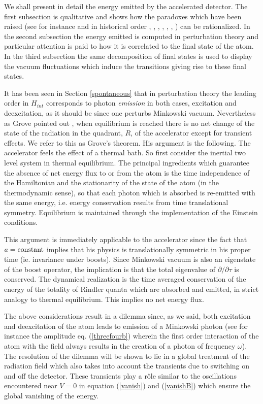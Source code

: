 \documentclass[12pt,oneside]{report}
\begin{document}
We shall present in detail the energy emitted by the
accelerated detector. The first subsection is qualitative and shows how the
paradoxes which have been raised (see for instance and in
historical order
\cite{UnWa}, \cite{Grow},
\cite{RSG}, \cite{Unru2}, \cite{MPB}, \cite{AuMu}, \cite{MaPa}) can be
rationalized. In the second subsection the energy emitted is computed in
perturbation theory and particular attention is paid to how it
is correlated to the final state of the atom. In the third
subsection the same decomposition of final states is used to
display the vacuum fluctuations which induce the transitions
giving rise to these final states.

It has been seen in Section \ref{spontaneous} that in perturbation theory the leading
order in $H_{int}$ corresponds to photon {\it emission} in both cases,
excitation and deexcitation, as it should be since one perturbs Minkowski
vacuum. Nevertheless as Grove pointed out \cite{Grow}, when equilibrium is
reached there is no net change of the state of the radiation in the quadrant,
$R$, of the accelerator except for transient effects. We refer to this as
Grove's theorem. His argument is the following. The accelerator feels the effect
of a thermal bath. 
So first consider the inertial two level system in thermal equilibrium. The
principal ingredients which guarantee the absence of net energy flux to or
from the atom is the time independence of the Hamiltonian and the
stationarity of the 
state of the atom (in the thermodynamic sense), so that each
photon which is absorbed  is re-emitted  with the
same energy, i.e. energy conservation results from time translational
symmetry. Equilibrium is maintained through the implementation of the
Einstein conditions.

This argument is immediately applicable to the accelerator since the
fact that $a={\rm constant}$ implies that his physics is translationally
symmetric in his proper time (ie. invariance under boosts). Since Minkowski vacuum is
also an eigenstate of the boost operator, the implication is that the total eigenvalue
of $\partial /\partial \tau$ is conserved. The dynamical realization is the time
averaged conservation of the energy of the totality of Rindler quanta which are
absorbed and emitted, in strict analogy to thermal equilibrium.
This implies no net energy flux.

The above considerations result in a dilemma since, as we said,
both excitation and deexcitation of the atom leads to emission
of a Minkowski photon (see for instance the
amplitude eq. (\ref{threefourb}) wherein the first order interaction of the atom
with the field always results in the creation of a photon of frequency
$\omega$).
The resolution of the dilemma will be shown to lie in a
global treatment of the radiation field which also takes into account the
transients due to switching on and off the detector. These transients play a r\^ole
similar to the oscillations  encountered near $V=0$ in equation (\ref{vanish})
and (\ref{vanishB}) which ensure the global vanishing of the energy.
\end{document}
